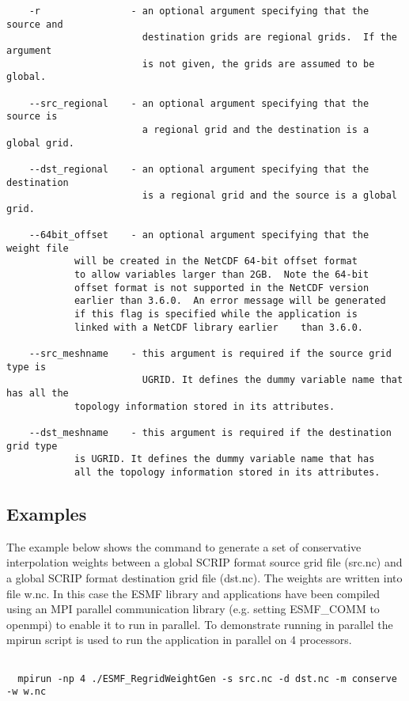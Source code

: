 \begin{verbatim}
    -r                - an optional argument specifying that the source and 
                        destination grids are regional grids.  If the argument
                        is not given, the grids are assumed to be global.

    --src_regional    - an optional argument specifying that the source is 
                        a regional grid and the destination is a global grid.  

    --dst_regional    - an optional argument specifying that the destination 
                        is a regional grid and the source is a global grid.  

    --64bit_offset    - an optional argument specifying that the weight file 
			will be created in the NetCDF 64-bit offset format 
			to allow variables larger than 2GB.  Note the 64-bit 
			offset format is not supported in the NetCDF version 
			earlier than 3.6.0.  An error message will be generated 
			if this flag is specified while the application is 
			linked with a NetCDF library earlier	than 3.6.0.

    --src_meshname    - this argument is required if the source grid type is
                        UGRID. It defines the dummy variable name that has all the
			topology information stored in its attributes.

    --dst_meshname    - this argument is required if the destination grid type 
			is UGRID. It defines the dummy variable name that has 
			all the topology information stored in its attributes.

\end{verbatim}


\subsection{Examples}

The example below shows the command to generate a set of conservative interpolation weights between a global 
SCRIP format source grid file (src.nc) and a global SCRIP format destination grid file (dst.nc). The weights
are written into file w.nc. In this case the
ESMF library and applications have been compiled using an MPI parallel communication library 
(e.g. setting ESMF\_COMM to openmpi) to enable it to run in parallel. To demonstrate running in parallel
the mpirun script is used to run the application in parallel on 4 processors. 

\begin{verbatim}

  mpirun -np 4 ./ESMF_RegridWeightGen -s src.nc -d dst.nc -m conserve -w w.nc

\end{verbatim}

